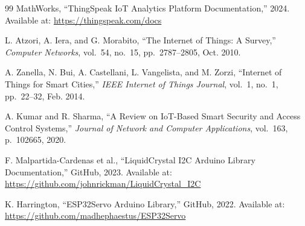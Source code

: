 \documentclass[12pt,a4paper]{article}
\begin{document}
\begin{thebibliography}{99}
MathWorks,
``ThingSpeak IoT Analytics Platform Documentation,''
2024. Available at: \url{https://thingspeak.com/docs}

L. Atzori, A. Iera, and G. Morabito,
``The Internet of Things: A Survey,''
\textit{Computer Networks}, vol.~54, no.~15, pp.~2787--2805, Oct. 2010.

A. Zanella, N. Bui, A. Castellani, L. Vangelista, and M. Zorzi,
``Internet of Things for Smart Cities,''
\textit{IEEE Internet of Things Journal}, vol.~1, no.~1, pp.~22--32, Feb. 2014.

A. Kumar and R. Sharma,
``A Review on IoT-Based Smart Security and Access Control Systems,''
\textit{Journal of Network and Computer Applications}, vol.~163, p.~102665, 2020.

F. Malpartida-Cardenas et al.,
``LiquidCrystal I2C Arduino Library Documentation,''
GitHub, 2023. Available at: \url{https://github.com/johnrickman/LiquidCrystal_I2C}

K. Harrington,
``ESP32Servo Arduino Library,''
GitHub, 2022. Available at: \url{https://github.com/madhephaestus/ESP32Servo}

\end{thebibliography}
\end{document}
